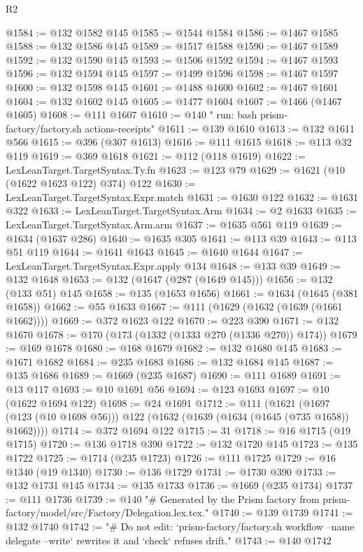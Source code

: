 \begin{lexlean}{R2}
\begin{coremodule}
@1584 := @132 @1582 @145
@1585 := @1544 @1584
@1586 := @1467 @1585
@1588 := @132 @1586 @145
@1589 := @1517 @1588
@1590 := @1467 @1589
@1592 := @132 @1590 @145
@1593 := @1506 @1592
@1594 := @1467 @1593
@1596 := @132 @1594 @145
@1597 := @1499 @1596
@1598 := @1467 @1597
@1600 := @132 @1598 @145
@1601 := @1488 @1600
@1602 := @1467 @1601
@1604 := @132 @1602 @145
@1605 := @1477 @1604
@1607 := @1466 (@1467 @1605)
@1608 := @111 @1607
@1610 := @140 "        run: bash prism-factory/factory.sh actions-receipts"
@1611 := @139 @1610
@1613 := @132 @1611 @566
@1615 := @396 (@307 @1613)
@1616 := @111 @1615
@1618 := @113 @32 @119
@1619 := @369 @1618
@1621 := @112 (@118 @1619)
@1622 := LexLeanTarget.TargetSyntax.Ty.fn
@1623 := @123 @79
@1629 := @1621 (@10 (@1622 @1623 @122) @374) @122
@1630 := LexLeanTarget.TargetSyntax.Expr.match
@1631 := @1630 @122
@1632 := @1631 @322
@1633 := LexLeanTarget.TargetSyntax.Arm
@1634 := @2 @1633
@1635 := LexLeanTarget.TargetSyntax.Arm.arm
@1637 := @1635 @561 @119
@1639 := @1634 (@1637 @286)
@1640 := @1635 @305
@1641 := @113 @39
@1643 := @113 @51 @119
@1644 := @1641 @1643
@1645 := @1640 @1644
@1647 := LexLeanTarget.TargetSyntax.Expr.apply @134
@1648 := @133 @39
@1649 := @132 @1648
@1653 := @132 (@1647 (@287 (@1649 @145)))
@1656 := @132 (@133 @51) @145
@1658 := @135 (@1653 @1656)
@1661 := @1634 (@1645 (@381 @1658))
@1662 := @55 @1633
@1667 := @111 (@1629 (@1632 (@1639 (@1661 @1662))))
@1669 := @372 @1623 @122
@1670 := @223 @390
@1671 := @132 @1670
@1678 := @170 (@173 (@1332 (@1333 @270 (@1336 @270)) @174))
@1679 := @169 @1678
@1680 := @168 @1679
@1682 := @132 @1680 @145
@1683 := @1671 @1682
@1684 := @235 @1683
@1686 := @132 @1684 @145
@1687 := @135 @1686
@1689 := @1669 (@235 @1687)
@1690 := @111 @1689
@1691 := @13 @117
@1693 := @10 @1691 @56
@1694 := @123 @1693
@1697 := @10 (@1622 @1694 @122)
@1698 := @24 @1691
@1712 := @111
    (@1621 (@1697 (@123 (@10 @1698 @56))) @122 (@1632 (@1639 (@1634 (@1645 (@735 @1658)) @1662))))
@1714 := @372 @1694 @122
@1715 := 31
@1718 := @16 @1715 (@19 @1715)
@1720 := @136 @1718 @390
@1722 := @132 @1720 @145
@1723 := @135 @1722
@1725 := @1714 (@235 @1723)
@1726 := @111 @1725
@1729 := @16 @1340 (@19 @1340)
@1730 := @136 @1729
@1731 := @1730 @390
@1733 := @132 @1731 @145
@1734 := @135 @1733
@1736 := @1669 (@235 @1734)
@1737 := @111 @1736
@1739 := @140
    "# Generated by the Prism factory from prism-factory/model/src/Factory/Delegation.lex.tex."
@1740 := @139 @1739
@1741 := @132 @1740
@1742 := "# Do not edit: `prism-factory/factory.sh workflow --name delegate --write` rewrites it and `check` refuses drift."
@1743 := @140 @1742

\end{coremodule}
\end{lexlean}
